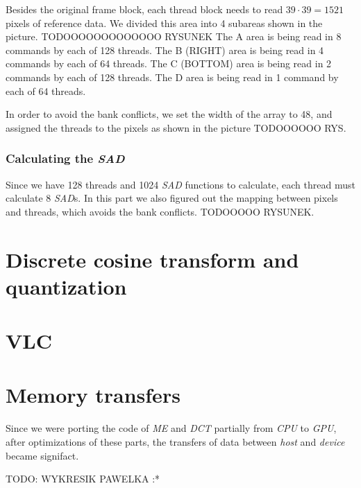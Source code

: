 \documentclass[11pt]{article}
\begin{document}
Besides the original frame block, each thread block needs to read 
$39 \cdot 39 = 1521$ pixels of reference data. We divided this area into
4 subareas shown in the picture. 
TODOOOOOOOOOOOOO RYSUNEK
The A area is being read in 8 commands by each of 128 threads.
The B (RIGHT) area is being read in 4 commands by each of 64 threads.
The C (BOTTOM) area is being read in 2 commands by each of 128 threads.
The D area is being read in 1 command by each of 64 threads.

In order to avoid the bank conflicts, we set the width of the array to 48,
and assigned the threads to the pixels as shown in the picture TODOOOOOO RYS.

\subsubsection{Calculating the \emph{SAD}}
Since we have 128 threads and 1024 \emph{SAD} functions to calculate, each
thread must calculate 8 \emph{SAD}s. In this part we also figured out the
mapping between pixels and threads, which avoids the bank conflicts.
TODOOOOO RYSUNEK.

\section{Discrete cosine transform and quantization}

\section{VLC}

\section{Memory transfers}
Since we were porting the code of \emph{ME} and \emph{DCT} partially from 
\emph{CPU} to \emph{GPU}, after optimizations of these parts, the transfers
of data between \emph{host} and \emph{device} became signifact.

TODO: WYKRESIK PAWELKA :*
\end{document}
